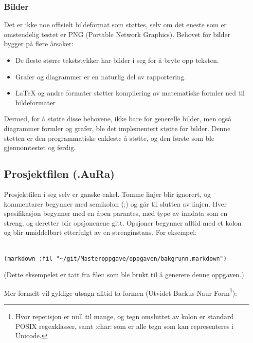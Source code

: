 \documentclass[norsk, 11pt, a4paper]{article}
\begin{document}
\subsubsection{Bilder}
Det er ikke noe offisielt bildeformat som støttes, selv om det eneste som er omstendelig testet er PNG (Portable Network Graphics). Behovet for bilder bygger på flere årsaker:




\begin{itemize}
\item De fleste større tekststykker har bilder i seg for å bryte opp teksten.
\item Grafer og diagrammer er en naturlig del av rapportering.
\item LaTeX og andre formater støtter kompilering av matematiske formler ned til bildeformater
\end{itemize}




Dermed, for å støtte disse behovene, ikke bare for generelle bilder, men også diagrammer formler og grafer, ble det implementert støtte for bilder. Denne støtten er den programmatiske enkleste å støtte, og den første som ble gjennomtestet og ferdig.



\subsection{Prosjektfilen (.AuRa)}



Prosjektfilen i seg selv er ganske enkel. Tomme linjer blir ignorert, og kommentarer begynner med semikolon (;) og går til slutten av linjen.
Hver spesifikasjon begynner med en åpen parantes, med type av inndata som en streng, og deretter blir opsjonenene gitt. Opsjoner begynner alltid med et kolon og blir umiddelbart etterfulgt av en strenginstans. For eksempel:




\begin{lstlisting}

(markdown :fil "~/git/Masteroppgave/oppgaven/bakgrunn.markdown")
\end{lstlisting}




(Dette eksempelet er tatt fra filen som ble brukt til å generere denne oppgaven.)



Mer formelt vil gyldige utsagn alltid ta formen (Utvidet Backus-Naur Form\footnote{Hvor repetisjon {} er null til mange, og tegn omsluttet av kolon er standard POSIX regexklasser, samt :char: som er alle tegn som kan representeres i Unicode.}):
\end{document}

